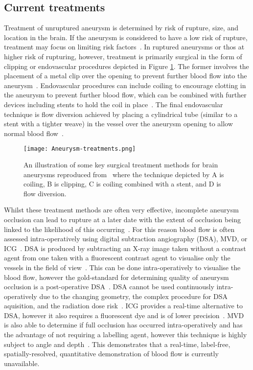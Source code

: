 \subsection{Current treatments}\label{sec:introaneurysmtreatments}
Treatment of unruptured aneurysm is determined by risk of rupture, size, and location in the brain. If the aneurysm is considered to have a low risk of rupture, treatment may focus on limiting risk factors~\cite{NationalHealthService2022}. In ruptured aneurysms or thos at higher risk of rupturing, however, treatment is primarily surgical in the form of clipping or endovascular procedures depicted in Figure \ref{fig:aneurysmtreatment}. The former involves the placement of a metal clip over the opening to prevent further blood flow into the aneurysm~\cite{TheBrainFoundation2023}. Endovascular procedures can include coiling to encourage clotting in the aneurysm to prevent further blood flow, which can be combined with further devices including stents to hold the coil in place~\cite{TheBrainFoundation2023}. The final endovascular technique is flow diversion achieved by placing a cylindrical tube (similar to a stent with a tighter weave) in the vessel over the aneurysm opening to allow normal blood flow~\cite{TheBrainFoundation2023}. 
\begin{figure}[h]
    \centering
    \texttt{[image: Aneurysm-treatments.png]}
    \caption{An illustration of some key surgical treatment methods for brain aneurysms reproduced from~\cite{TheBrainFoundation2023} where the technique depicted by A is coiling, B is clipping, C is coiling combined with a stent, and D is flow diversion.}
    \label{fig:aneurysmtreatment}
\end{figure}
Whilst these treatment methods are often very effective, incomplete aneurysm occlusion can lead to rupture at a later date with the extent of occlusion being linked to the likelihood of this occurring~\cite{Toth2018}. For this reason blood flow is often assessed intra-operatively using digital subtraction angiography (DSA), MVD, or ICG~\cite{Norat2019}. DSA is produced by subtracting an X-ray image taken without a contrast agent from one taken with a fluorescent contrast agent to visualise only the vessels in the field of view~\cite{Radiopia2022}. This can be done intra-operatively to visualise the blood flow, however the gold-standard for determining quality of aneurysm occlusion is a post-operative DSA~\cite{Marbacher2020}. DSA cannot be used continuously intra-operatively due to the changing geometry, the complex procedure for DSA aquisition, and the radiation dose risk~\cite{Radiopia2022, Derdeyn1999}. ICG provides a real-time alternative to DSA, however it also requires a fluorescent dye and is of lower precision~\cite{Norat2019, Anania2023}. MVD is also able to determine if full occlusion has occurred intra-operatively and has the advantage of not requiring a labelling agent, however this technique is highly subject to angle and depth~\cite{Anania2023}. This demonstrates that a real-time, label-free, spatially-resolved, quantitative demonstration of blood flow is currently unavailable. 
